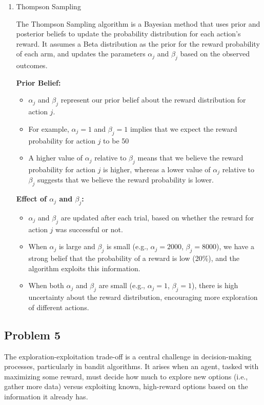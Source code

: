 \documentclass[11pt]{article}
\begin{document}
\begin{enumerate}[1.]
\item Thompson Sampling

The Thompson Sampling algorithm is a Bayesian method that uses prior and posterior beliefs to update the probability distribution for each action's reward. It assumes a Beta distribution as the prior for the reward probability of each arm, and updates the parameters \(\alpha_j\) and \(\beta_j\) based on the observed outcomes.

  \textbf{Prior Belief:}
    \begin{itemize}
        \item \(\alpha_j\) and \(\beta_j\) represent our prior belief about the reward distribution for action \(j\).
        \item For example, \(\alpha_j = 1\) and \(\beta_j = 1\) implies that we expect the reward probability for action \(j\) to be 50%
        \item A higher value of \(\alpha_j\) relative to \(\beta_j\) means that we believe the reward probability for action \(j\) is higher, whereas a lower value of \(\alpha_j\) relative to \(\beta_j\) suggests that we believe the reward probability is lower.
    \end{itemize}

  \textbf{Effect of \(\alpha_j\) and \(\beta_j\):}
    \begin{itemize}
        \item \(\alpha_j\) and \(\beta_j\) are updated after each trial, based on whether the reward for action \(j\) was successful or not.
        \item When \(\alpha_j\) is large and \(\beta_j\) is small (e.g., \(\alpha_j = 2000\), \(\beta_j = 8000\)), we have a strong belief that the probability of a reward is low (20\%), and the algorithm exploits this information.
        \item When both \(\alpha_j\) and \(\beta_j\) are small (e.g., \(\alpha_j = 1\), \(\beta_j = 1\)), there is high uncertainty about the reward distribution, encouraging more exploration of different actions.
    \end{itemize}

\end{enumerate}


\newpage
\subsection{Problem 5}
The exploration-exploitation trade-off is a central challenge in decision-making processes, particularly in bandit algorithms. It arises when an agent, tasked with maximizing some reward, must decide how much to explore new options (i.e., gather more data) versus exploiting known, high-reward options based on the information it already has.
\end{document}
